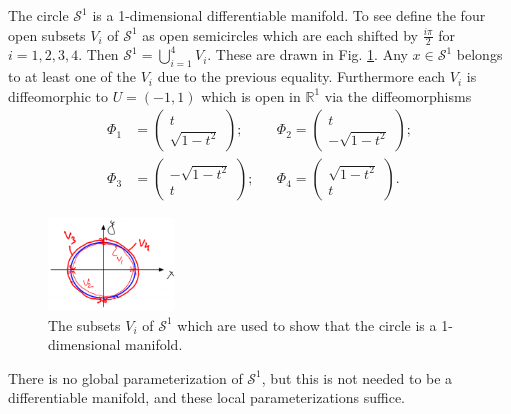 \begin{ex}
	The circle $\mathcal{S}^{1}$ is a 1-dimensional differentiable manifold. To see define the four open subsets $V_i$ of $\mathcal{S}^{1}$ as open semicircles which are each shifted by $\frac{i \pi }{2} $ for $i=1,2,3,4$. Then $\mathcal{S}^{1} = \bigcup_{i=1}^{4}V_i$. These are drawn in Fig. \ref{fig:s1_subsets}. Any $x\in \mathcal{S}^{1}$ belongs to at least one of the $V_i$ due to the previous equality. Furthermore each $V_i$ is diffeomorphic to $U=(-1,1)$ which is open in $\mathbb{R}^{1}$ via the diffeomorphisms
	\begin{subequations}
		\begin{align}
		\Phi_1 &= 
		\begin{pmatrix}
			t\\ \sqrt{1-t^2}
		\end{pmatrix}
		;&&\Phi_2 = 
		\begin{pmatrix}
			t\\ -\sqrt{1-t^2}
		\end{pmatrix}
		; \\
		\Phi_3 &= 
		\begin{pmatrix}
			-\sqrt{1-t^2}\\ t
		\end{pmatrix}
		;&&\Phi_4 = 
		\begin{pmatrix}
			\sqrt{1-t^2}\\ t
		\end{pmatrix}
		.
		\end{align}
	\end{subequations}
\begin{figure}[h!]
	\centering
	\includegraphics[width=0.3\textwidth]{figures/ch9/3s1_subsets.png}
	\caption{The subsets $V_i$ of $\mathcal{S}^{1} $ which are used to show that the circle is a 1-dimensional manifold.}
	\label{fig:s1_subsets}
\end{figure}

There is no global parameterization of $\mathcal{S}^{1}$, but this is not needed to be a differentiable manifold, and these local parameterizations suffice.	
\end{ex}

